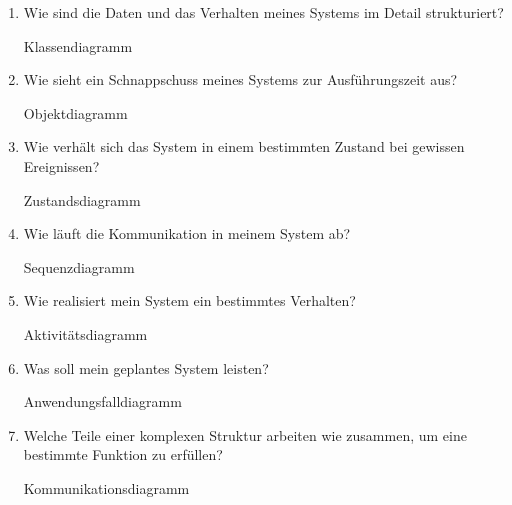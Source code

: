 \documentclass{bschlangaul-aufgabe}
\begin{document}
\begin{enumerate}

\item Wie sind die Daten und das Verhalten meines Systems im Detail
strukturiert?

\begin{bAntwort}
Klassendiagramm
\end{bAntwort}

\item Wie sieht ein Schnappschuss meines Systems zur Ausführungszeit
aus?

\begin{bAntwort}
Objektdiagramm
\end{bAntwort}

\item Wie verhält sich das System in einem bestimmten Zustand bei
gewissen Ereignissen?

\begin{bAntwort}
Zustandsdiagramm
\end{bAntwort}

\item Wie läuft die Kommunikation in meinem System ab?

\begin{bAntwort}
Sequenzdiagramm
\end{bAntwort}

\item Wie realisiert mein System ein bestimmtes Verhalten?

\begin{bAntwort}
Aktivitätsdiagramm
\end{bAntwort}

\item Was soll mein geplantes System leisten?

\begin{bAntwort}
Anwendungsfalldiagramm
\end{bAntwort}

\item Welche Teile einer komplexen Struktur arbeiten wie zusammen, um
eine bestimmte Funktion zu erfüllen?

\begin{bAntwort}
Kommunikationsdiagramm
\end{bAntwort}
\end{enumerate}
\end{document}
